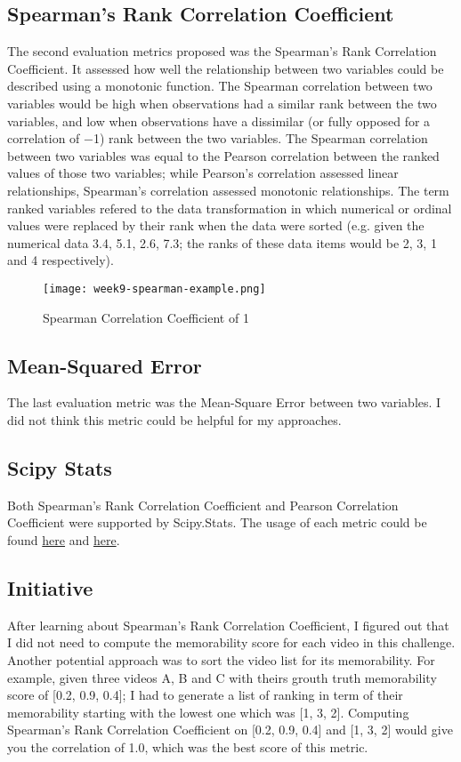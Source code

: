 \subsection{Spearman's Rank Correlation Coefficient}
The second evaluation metrics proposed was the Spearman's Rank Correlation Coefficient. It assessed how well the relationship between two variables could be described using a monotonic function. The Spearman correlation between two variables would be high when observations had a similar rank between the two variables, and low when observations have a dissimilar (or fully opposed for a correlation of −1) rank between the two variables. The Spearman correlation between two variables was equal to the Pearson correlation between the ranked values of those two variables; while Pearson's correlation assessed linear relationships, Spearman's correlation assessed monotonic relationships. The term ranked variables refered to the data transformation in which numerical or ordinal values were replaced by their rank when the data were sorted (e.g. given the numerical data 3.4, 5.1, 2.6, 7.3; the ranks of these data items would be 2, 3, 1 and 4 respectively).

\begin{figure}[!ht]
\centering
\texttt{[image: week9-spearman-example.png]}
\caption{Spearman Correlation Coefficient of 1}
\end{figure}

\subsection{Mean-Squared Error}
The last evaluation metric was the Mean-Square Error between two variables. I did not think this metric could be helpful for my approaches.

\subsection{Scipy Stats}
Both Spearman's Rank Correlation Coefficient and Pearson Correlation Coefficient were supported by Scipy.Stats. The usage of each metric could be found \href{https://docs.scipy.org/doc/scipy/reference/generated/scipy.stats.spearmanr.html}{here} and \href{https://docs.scipy.org/doc/scipy-0.14.0/reference/generated/scipy.stats.pearsonr.html}{here}.

\subsection{Initiative}
After learning about Spearman's Rank Correlation Coefficient, I figured out that I did not need to compute the memorability score for each video in this challenge. Another potential approach was to sort the video list for its memorability. For example, given three videos A, B and C with theirs grouth truth memorability score of [0.2, 0.9, 0.4]; I had to generate a list of ranking in term of their memorability starting with the lowest one which was [1, 3, 2]. Computing Spearman's Rank Correlation Coefficient on [0.2, 0.9, 0.4] and [1, 3, 2] would give you the correlation of 1.0, which was the best score of this metric.

